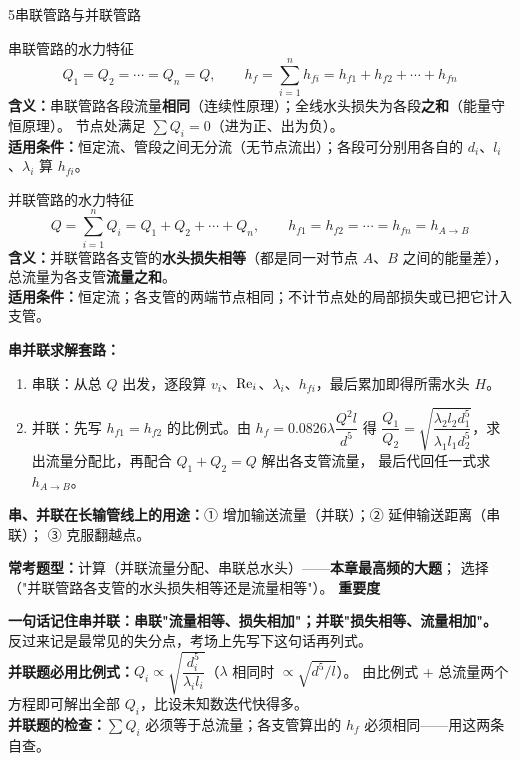 \begin{kaodian}{5}{串联管路与并联管路}
\begin{gongshi}{串联管路的水力特征}
\[ Q_1=Q_2=\cdots=Q_n=Q,\qquad h_f=\sum_{i=1}^{n}h_{fi}=h_{f1}+h_{f2}+\cdots+h_{fn} \]
\textbf{含义：}串联管路各段流量\textbf{相同}（连续性原理）；全线水头损失为各段\textbf{之和}（能量守恒原理）。
节点处满足 $\sum Q_i=0$（进为正、出为负）。\\
\textbf{适用条件：}恒定流、管段之间无分流（无节点流出）；各段可分别用各自的 $d_i$、$l_i$、$\lambda_i$ 算 $h_{fi}$。
\end{gongshi}

\begin{gongshi}{并联管路的水力特征}
\[ Q=\sum_{i=1}^{n}Q_i=Q_1+Q_2+\cdots+Q_n,\qquad
   h_{f1}=h_{f2}=\cdots=h_{fn}=h_{A\to B} \]
\textbf{含义：}并联管路各支管的\textbf{水头损失相等}（都是同一对节点 $A$、$B$ 之间的能量差），
总流量为各支管\textbf{流量之和}。\\
\textbf{适用条件：}恒定流；各支管的两端节点相同；不计节点处的局部损失或已把它计入支管。
\end{gongshi}

\textbf{串并联求解套路：}
\begin{enumerate}
\item 串联：从总 $Q$ 出发，逐段算 $v_i$、$\mathrm{Re}_i$、$\lambda_i$、$h_{fi}$，最后累加即得所需水头 $H$。
\item 并联：先写 $h_{f1}=h_{f2}$ 的比例式。由 $h_f=0.0826\lambda\dfrac{Q^2l}{d^5}$ 得
$\dfrac{Q_1}{Q_2}=\sqrt{\dfrac{\lambda_2l_2d_1^5}{\lambda_1l_1d_2^5}}$，求出流量分配比，再配合 $Q_1+Q_2=Q$ 解出各支管流量，
最后代回任一式求 $h_{A\to B}$。
\end{enumerate}

\textbf{串、并联在长输管线上的用途：}① 增加输送流量（并联）；② 延伸输送距离（串联）；
③ 克服翻越点。

\textbf{常考题型：}计算（并联流量分配、串联总水头）——\textbf{本章最高频的大题}；
选择（"并联管路各支管的水头损失相等还是流量相等"）。
\textbf{重要度 }\quad{}\quad{}

\begin{banfa}
\textbf{一句话记住串并联：串联"流量相等、损失相加"；并联"损失相等、流量相加"。}
反过来记是最常见的失分点，考场上先写下这句话再列式。\\
\textbf{并联题必用比例式：}$Q_i\propto\sqrt{\dfrac{d_i^5}{\lambda_i l_i}}$（$\lambda$ 相同时 $\propto\sqrt{d^5/l}$）。
由比例式 + 总流量两个方程即可解出全部 $Q_i$，比设未知数迭代快得多。\\
\textbf{并联题的检查：}$\sum Q_i$ 必须等于总流量；各支管算出的 $h_f$ 必须相同——用这两条自查。
\end{banfa}


\end{kaodian}
